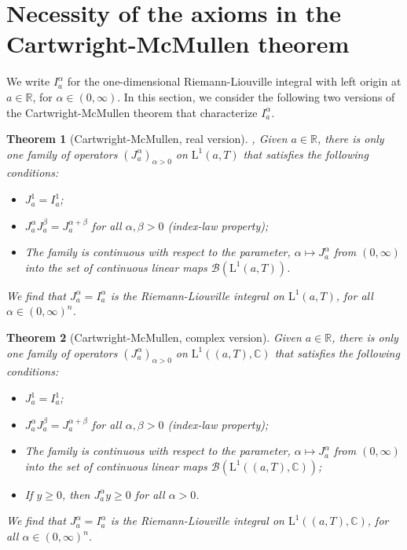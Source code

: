 \documentclass[12pt,reqno]{amsart}
\theoremstyle{plain}
\newtheorem{theorem}{Theorem}[section] %
\numberwithin{equation}{section} %
\begin{document}
\section{Necessity of the axioms in the Cartwright-McMullen theorem} \label{sec_neces}

We write $I_a^\alpha$ for the one-dimensional Riemann-Liouville integral with left origin at $a\in\mathbb{R}$, for $\alpha\in (0,\infty)$. In this section, we consider the following two versions of the Cartwright-McMullen theorem that characterize $I_a^\alpha$.

\begin{theorem}[Cartwright-McMullen, real version] \label{t1} \cite[Theorem~2.18]{tese}, \cite[Theorem~2.1]{cao_jie}
Given $a\in\mathbb{R}$, there is only one family of operators $(J_a^\alpha)_{\alpha>0}$ on $\mathrm{L}^1(a,T)$ that satisfies the following conditions:
\begin{itemize}
\item[1.] $J_a^1=I_a^1$;
\item[2.] $J_a^\alpha J_a^\beta=J_a^{\alpha+\beta}$ for all $\alpha,\beta>0$ (index-law property);
\item[3.] The family is continuous with respect to the parameter, $\alpha\mapsto J_a^\alpha$ from $(0,\infty)$ into the set of continuous linear maps $\mathcal{B}(\mathrm{L}^1(a,T))$.
\end{itemize}
We find that $J_a^\alpha=I_a^\alpha$ is the Riemann-Liouville integral on $\mathrm{L}^1(a,T)$, for all $\alpha\in (0,\infty)^n$.
\end{theorem}

\begin{theorem}[Cartwright-McMullen, complex version] \label{t2} \cite{cart}
Given $a\in\mathbb{R}$, there is only one family of operators $(J_a^\alpha)_{\alpha>0}$ on $\mathrm{L}^1((a,T),\mathbb{C})$ that satisfies the following conditions:
\begin{itemize}
\item[A.] $J_a^1=I_a^1$;
\item[B.] $J_a^\alpha J_a^\beta=J_a^{\alpha+\beta}$ for all $\alpha,\beta>0$ (index-law property);
\item[C.] The family is continuous with respect to the parameter, $\alpha\mapsto J_a^\alpha$ from $(0,\infty)$ into the set of continuous linear maps $\mathcal{B}(\mathrm{L}^1((a,T),\mathbb{C}))$;
\item[D.] If $y\geq0$, then $J_a^\alpha y\geq0$ for all $\alpha>0$.
\end{itemize}
We find that $J_a^\alpha=I_a^\alpha$ is the Riemann-Liouville integral on $\mathrm{L}^1((a,T),\mathbb{C})$, for all $\alpha\in (0,\infty)^n$.
\end{theorem}
\end{document}
